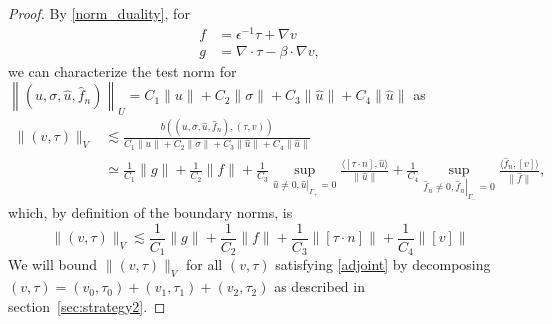\documentclass[11pt,onecolumn]{scrartcl}
\newcommand{\grad}{\nabla}
\renewcommand{\div}{\grad \cdot}
\begin{document}
\begin{proof}
By \eqref{norm_duality}, for 
\begin{align*}
f &= \epsilon^{-1}\tau + \grad v  \\
g &=\div \tau - \beta\cdot \grad v,
\end{align*} 
we can characterize the test norm for $\left\|\left(u,\sigma,\widehat{u},\widehat{f}_n\right)\right\|_U = C_1\|u\| + C_2\|\sigma\| + C_3\|\widehat{u}\|+ C_4\|\widehat{u}\|$ as
\begin{align*}
\|\left(v,\tau\right)\|_V &\lesssim \frac{b\left(\left(u,\sigma,\widehat{u},\widehat{f}_n\right),\left(\tau,v\right)\right)}{C_1\|u\| + C_2\|\sigma\| + C_3\|\widehat{u}\|+ C_4\|\widehat{u}\|}\\
& \simeq \frac{1}{C_1}\|g\| + \frac{1}{C_2}\|f\| + \frac{1}{C_3}\sup_{\widehat{u}\neq 0, \left.\widehat{u}\right|_{\Gamma_+} = 0} \frac{\langle [\tau\cdot n], \widehat{u}\rangle}{\|\widehat{u}\|} + \frac{1}{C_4}\sup_{\widehat{f}_n\neq 0, \left.\widehat{f}_n\right|_{\Gamma_-}=0}\frac{\langle \widehat{f}_n, [v]\rangle}{\|\widehat{f}\|},
\end{align*}
which, by definition of the boundary norms, is 
\[
\|\left(v,\tau\right)\|_V \lesssim \frac{1}{C_1}\|g\| + \frac{1}{C_2}\|f\| + \frac{1}{C_3}\|[\tau\cdot n]\| + \frac{1}{C_4}\|[v]\|
\]
We will bound $\|\left(v,\tau\right)\|_V$ for all $\left(v,\tau\right)$ satisfying \eqref{adjoint} by decomposing $\left(v,\tau\right) = \left(v_0,\tau_0\right) + \left(v_1,\tau_1\right) + \left(v_2,\tau_2\right)$ as described in section~\ref{sec:strategy2}.  

\end{proof}
\end{document}
